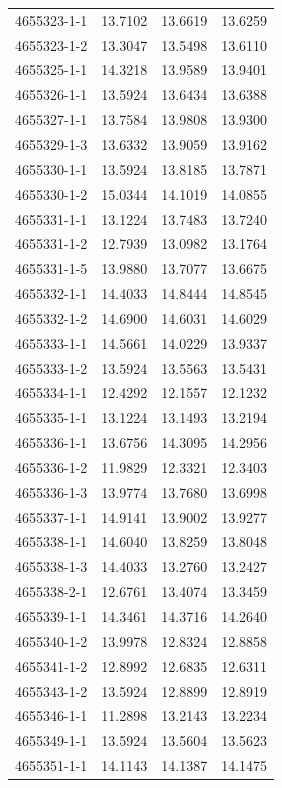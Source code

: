 \begin{longtable}{lrrr}
4655323-1-1 & 13.7102 & 13.6619 & 13.6259 \\
4655323-1-2 & 13.3047 & 13.5498 & 13.6110 \\
4655325-1-1 & 14.3218 & 13.9589 & 13.9401 \\
4655326-1-1 & 13.5924 & 13.6434 & 13.6388 \\
4655327-1-1 & 13.7584 & 13.9808 & 13.9300 \\
4655329-1-3 & 13.6332 & 13.9059 & 13.9162 \\
4655330-1-1 & 13.5924 & 13.8185 & 13.7871 \\
4655330-1-2 & 15.0344 & 14.1019 & 14.0855 \\
4655331-1-1 & 13.1224 & 13.7483 & 13.7240 \\
4655331-1-2 & 12.7939 & 13.0982 & 13.1764 \\
4655331-1-5 & 13.9880 & 13.7077 & 13.6675 \\
4655332-1-1 & 14.4033 & 14.8444 & 14.8545 \\
4655332-1-2 & 14.6900 & 14.6031 & 14.6029 \\
4655333-1-1 & 14.5661 & 14.0229 & 13.9337 \\
4655333-1-2 & 13.5924 & 13.5563 & 13.5431 \\
4655334-1-1 & 12.4292 & 12.1557 & 12.1232 \\
4655335-1-1 & 13.1224 & 13.1493 & 13.2194 \\
4655336-1-1 & 13.6756 & 14.3095 & 14.2956 \\
4655336-1-2 & 11.9829 & 12.3321 & 12.3403 \\
4655336-1-3 & 13.9774 & 13.7680 & 13.6998 \\
4655337-1-1 & 14.9141 & 13.9002 & 13.9277 \\
4655338-1-1 & 14.6040 & 13.8259 & 13.8048 \\
4655338-1-3 & 14.4033 & 13.2760 & 13.2427 \\
4655338-2-1 & 12.6761 & 13.4074 & 13.3459 \\
4655339-1-1 & 14.3461 & 14.3716 & 14.2640 \\
4655340-1-2 & 13.9978 & 12.8324 & 12.8858 \\
4655341-1-2 & 12.8992 & 12.6835 & 12.6311 \\
4655343-1-2 & 13.5924 & 12.8899 & 12.8919 \\
4655346-1-1 & 11.2898 & 13.2143 & 13.2234 \\
4655349-1-1 & 13.5924 & 13.5604 & 13.5623 \\
4655351-1-1 & 14.1143 & 14.1387 & 14.1475 \\

\end{longtable}
